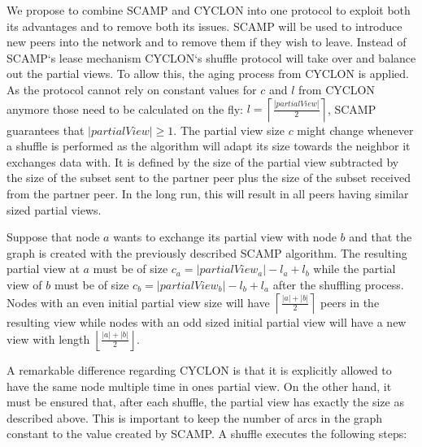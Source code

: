 \documentclass[11pt, english, screen]{report-rd-info}
\begin{document}
We propose to combine SCAMP and CYCLON into one protocol to exploit both its advantages and to remove both its issues.
SCAMP will be used to introduce new peers into the network and to remove them if they wish to leave.
Instead of SCAMP`s lease mechanism CYCLON`s shuffle protocol will take over and balance out the partial views.
To allow this, the aging process from CYCLON is applied.
As the protocol cannot rely on constant values for $c$ and $l$ from CYCLON anymore those need to be calculated on the fly: $l = \left \lceil{\frac{|partialView|}{2}}\right \rceil$,
SCAMP guarantees that $|partialView| \geq 1$.
The partial view size $c$ might change whenever a shuffle is performed as the algorithm will adapt its size towards the neighbor it exchanges data with.
It is defined by the size of the partial view subtracted by the size of the subset sent to the partner peer plus the size of the subset received from the partner peer. 
In the long run, this will result in all peers having similar sized partial views. 

Suppose that node $a$ wants to exchange its partial view with node $b$ and that the graph is created with the previously described SCAMP algorithm. 
The resulting partial view at $a$ must be of size $c_a = |partialView_a| - l_a + l_b$ while the partial view of $b$ must be of size $c_b = |partialView_b| - l_b + l_a$ after the shuffling process.
Nodes with an even initial partial view size will have $\left \lceil{\frac{|a|+|b|}{2}}\right \rceil$ peers in the resulting view while nodes with an odd sized initial partial view will have a new view with length $\left \lfloor{\frac{|a|+|b|}{2}}\right \rfloor$.

A remarkable difference regarding CYCLON is that it is explicitly allowed to have the same node multiple time in ones partial view. 
On the other hand, it must be ensured that, after each shuffle, the partial view has exactly the size as described above.
This is important to keep the number of arcs in the graph constant to the value created by SCAMP.
A shuffle executes the following steps:
\end{document}
